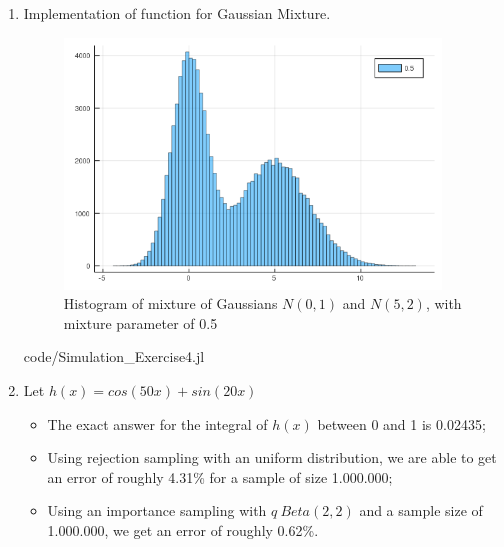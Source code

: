 \documentclass[12pt,letterpaper]{article}
\begin{document}
\begin{enumerate}[leftmargin=!,labelindent=5pt]
	\newpage
	\item Implementation of function for Gaussian Mixture.
        \begin{figure}[H]
            \centering
            \includegraphics[width=10cm]{images/Ex4.png}
            \caption{Histogram of mixture of Gaussians $N(0,1)$
            and $N(5,2)$, with mixture parameter of 0.5}
            \label{fig:5}
        \end{figure}
        
        {code/Simulation_Exercise4.jl}

	\newpage
	\item Let $h(x) = cos(50x)+sin(20x)$
	\begin{itemize}
		\item The exact answer for the integral of $h(x)$ between
		0 and 1 is 0.02435;

		\item Using rejection sampling with an uniform distribution,
		we are able to get an error of roughly 4.31\% for a sample of
		size 1.000.000;

		\item Using an importance sampling with $q ~ Beta(2,2)$ and
		a sample size of 1.000.000, we get an error of roughly 0.62\%.


	\end{itemize}

\end{enumerate}


\newpage
\end{document}
